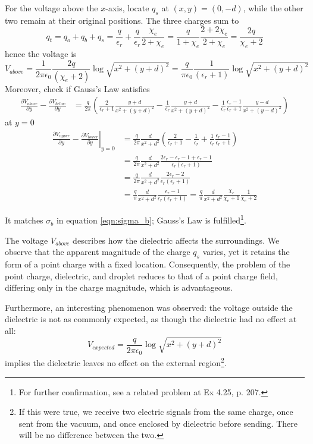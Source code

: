 For the voltage above the $x$-axis, locate $q_s$ at $(x,y) = (0,-d)$, while the other two remain at their original positions. The three charges sum to
\[q_t=
q_o+q_b+q_s=\frac{q}{\epsilon_r}+\frac{q}{\epsilon_r}\frac{\chi_e}{2+\chi_e}=\frac{q}{1+\chi_e}\frac{2+2\chi_e}{2+\chi_e}=\frac{2q}{\chi_e+2}
\]
hence the voltage is
\[
V_{above}=\frac{1}{2\pi\epsilon_0}\frac{2 q}{({\chi_e+2})}\log\sqrt{x^2+(y+d)^2}=\frac{q}{\pi\epsilon_0}\frac{1}{(\epsilon_r+1)}\log\sqrt{x^2+(y+d)^2}
\]
Moreover, check if Gauss's Law satisfies
\begin{align*}
\frac{\partial V_{above}}{\partial y}-\frac{\partial V_{below}}{\partial y}&=\frac{q}{2\pi} \left( \frac{2}{\epsilon_r + 1} \frac{y + d}{x^2 + (y + d)^2} - \frac{1}{\epsilon_r} \frac{y + d}{x^2 + (y + d)^2} -\frac{1}{\epsilon_r} \frac{\epsilon_r-1}{\epsilon_r+1}\frac{y - d}{x^2 + (y - d)^2}\right)   
\end{align*}
at $y=0$
\begin{align*}
\left.\frac{\partial V_{upper}}{\partial y}-\frac{\partial V_{lower}}{\partial y}\right|_{y=0}&=\frac{q}{2\pi} \frac{d}{x^2 + d^2}\left( \frac{2}{\epsilon_r + 1} - \frac{1}{\epsilon_r} +\frac{1}{\epsilon_r}\frac{\epsilon_r-1}{\epsilon_r + 1}  \right) \\
    &=\frac{q}{2\pi}  \frac{d}{x^2 + d^2}  \frac{2\epsilon_r -\epsilon_r -1+\epsilon_r -1}{\epsilon_r(\epsilon_r + 1)} \\
    &=\frac{q}{2\pi}  \frac{d}{x^2 + d^2} \frac{2\epsilon_r -2}{\epsilon_r(\epsilon_r + 1)} \\
    &=\frac{q}{\pi}  \frac{d}{x^2 + d^2} \frac{\epsilon_r -1}{\epsilon_r(\epsilon_r + 1)}=\frac{q}{\pi}  \frac{d}{x^2 + d^2}\frac{\chi_e}{\chi_e +1}\frac{1}{\chi_e +2}
\end{align*}

It matches $\sigma_b$ in equation \ref{eqn:sigma_b}; Gauss's Law is fulfilled\footnote{For further confirmation, see a related problem at \citet{Griffiths_2017} Ex 4.25, p. 207.}. 

The voltage $V_{above}$ describes how the dielectric affects the surroundings. We observe that the apparent magnitude of the charge $q_s$ varies, yet it retains the form of a point charge with a fixed location. Consequently, the problem of the point charge, dielectric, and droplet reduces to that of a point charge field, differing only in the charge magnitude, which is advantageous.

Furthermore, an interesting phenomenon was observed: the voltage outside the dielectric is not as commonly expected, as though the dielectric had no effect at all:
\[
V_{expected}=\frac{q}{2\pi\epsilon_0}\log\sqrt{x^2+(y+d)^2}
\]
implies the dielectric leaves no effect on the external  region\footnote{If this were true, we receive two electric signals from the same charge, once sent from the vacuum, and once enclosed by dielectric before sending. There will be no difference between the two.}.  

